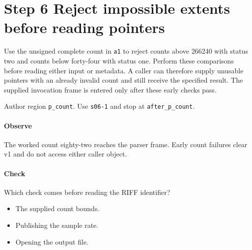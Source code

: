 \section{Step 6 Reject impossible extents before reading pointers}\label{pcm-wav-s06}
Use the unsigned complete count in \texttt{a1} to reject counts above 266240 with status two and counts below forty-four with status one. Perform these comparisons before reading either input or metadata. A caller can therefore supply unusable pointers with an already invalid count and still receive the specified result. The supplied invocation frame is entered only after these early checks pass.

Author region \texttt{p\_count}. Use \texttt{s06-1} and stop at \texttt{after\_p\_count}.

\paragraph{Observe} The worked count eighty-two reaches the parser frame. Early count failures clear v1 and do not access either caller object.

\paragraph{Check} Which check comes before reading the RIFF identifier?
\begin{itemize}
\item[A.] The supplied count bounds.
\item[B.] Publishing the sample rate.
\item[C.] Opening the output file.
\end{itemize}
